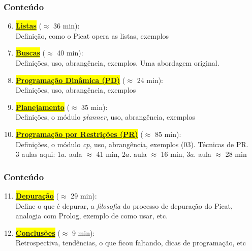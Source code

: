 			
\begin{frame}[fragile]
  \frametitle{Conteúdo}
  
  \begin{enumerate}

   \setcounter{enumi}{5}
    \item  \colorbox{yellow}{\textbf{\underline{Listas}}} ($\approx$ 36 min):\\
    Definição, como o Picat opera as listas, exemplos


    \pause
    \item  \colorbox{yellow}{\textbf{\underline{Buscas}}} ($\approx$ 40 min):\\
     Definições, uso, abrangência, exemplos. Uma abordagem
     original.

    \pause
    \item \colorbox{yellow}{\textbf{\underline{Programação Dinâmica (PD)}}} ($\approx$ 24 min):\\
    Definições, uso, abrangência, exemplos

    
    \pause
    \item \colorbox{yellow}{\textbf{\underline{Planejamento}}} ($\approx$ 35 min):\\
        Definições, o módulo \textit{planner}, uso, abrangência, exemplos

    \pause
		\item \colorbox{yellow}{\textbf{\underline{Programação por Restrições (PR)}}} ($\approx$ 85 min):\\
      Definições, o módulo \textit{cp}, uso, abrangência, exemplos (03).
      Técnicas de PR.\\
      3 aulas aqui: $1a.$ aula $\approx$ 41 min, $2a.$ aula $\approx$ 16 min,
      $3a.$ aula $\approx$ 28 min
      
    
\end{enumerate}

\end{frame}


			
\begin{frame}[fragile]
  \frametitle{Conteúdo}
  
  \begin{enumerate}

   \setcounter{enumi}{10}

     \item \colorbox{yellow}{\textbf{\underline{Depuração}}} ($\approx$ 29 min):\\
     Define o que é depurar, a {\em filosofia} do processo de depuração do Picat,
     analogia com Prolog, exemplo de como usar, etc.
     
	\item  \colorbox{yellow}{\textbf{\underline{Conclusões}}} ($\approx$ 9 min):\\
    Retrospectiva, tendências, o que ficou faltando, 
    dicas de programação, etc

    
\end{enumerate}

\end{frame}


